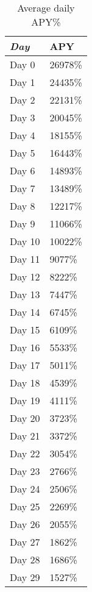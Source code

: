 \documentclass[11pt]{scrartcl} %
\begin{document}
\begin{table*}[h] %
	\centering %
	\begin{tabular}{p{2cm} p{2cm}}
		\toprule
		\textit{Day} & \textbf{APY} \\
		\bottomrule
		Day 0 & 26978\%\\
		Day 1 & 24435\%\\
		Day 2 & 22131\%\\
		Day 3 & 20045\%\\
		Day 4 & 18155\%\\
		Day 5 & 16443\%\\
		Day 6 & 14893\%\\
		Day 7 & 13489\%\\
		Day 8 & 12217\%\\
		Day 9 & 11066\%\\
		Day 10 & 10022\%\\
		Day 11 & 9077\%\\
		Day 12 & 8222\%\\
		Day 13 & 7447\%\\
		Day 14 & 6745\%\\
		Day 15 & 6109\%\\
		Day 16 & 5533\%\\
		Day 17 & 5011\%\\
		Day 18 & 4539\%\\
		Day 19 & 4111\%\\
		Day 20 & 3723\%\\
		Day 21 & 3372\%\\
		Day 22 & 3054\%\\
		Day 23 & 2766\%\\
		Day 24 & 2506\%\\
		Day 25 & 2269\%\\
		Day 26 & 2055\%\\
		Day 27 & 1862\%\\
		Day 28 & 1686\%\\
		Day 29 & 1527\%\\
	\end{tabular}
	\caption{Average daily APY\%}
\end{table*}
\end{document}
